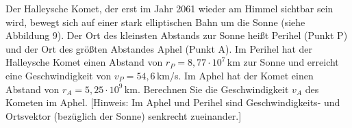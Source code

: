 \begin{ExerciseBlock}
Der Halleysche Komet, der erst im Jahr 2061 wieder am Himmel sichtbar sein wird, bewegt sich auf einer stark elliptischen Bahn um die Sonne (siehe Abbildung 9). Der Ort des kleinsten Abstands zur Sonne heißt Perihel (Punkt P) und der Ort des größten Abstandes Aphel (Punkt A). Im Perihel hat der Halleysche Komet einen Abstand von $r_P = 8,77 \cdot 10^7 \,$km zur Sonne und erreicht eine Geschwindigkeit von $v_P = 54,6 \,$km/s. Im Aphel hat der Komet einen Abstand von $r_A = 5,25 \cdot 10^9\,$km. Berechnen Sie die Geschwindigkeit $v_A$ des Kometen im Aphel. [Hinweis: Im Aphel und Perihel sind Geschwindigkeits- und Ortsvektor (bezüglich der Sonne) senkrecht zueinander.]

\begin{center}
\end{center}
\end{ExerciseBlock}
